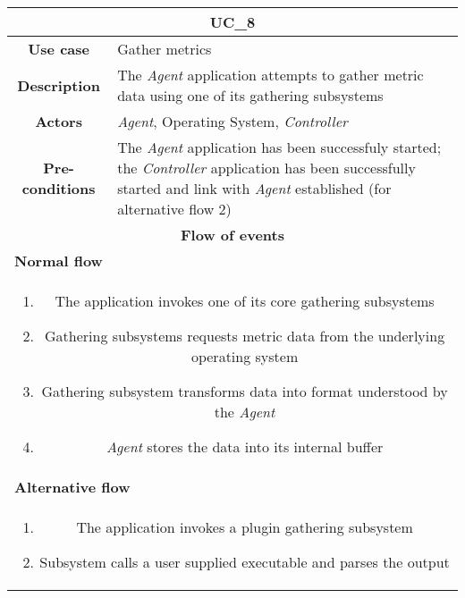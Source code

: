             \vspace{0.5cm}
            \noindent
            \begin{longtable}{ |c|p{11.8cm}| }
                \hline
                \multicolumn{2}{|c|}{\cellcolor{lime} \textbf{UC\_8}}\\ \hline
                \cellcolor[gray]{0.9} \textbf{Use case} & Gather metrics\\ \hline
                \cellcolor[gray]{0.9} \textbf{Description} & The \textit{Agent} application attempts to gather metric data using one of its gathering subsystems\\ \hline
                \cellcolor[gray]{0.9} \textbf{Actors} & \textit{Agent}, Operating System, \textit{Controller}\\ \hline
                \cellcolor[gray]{0.9} \textbf{Pre-conditions} & The \textit{Agent} application has been successfuly started; the \textit{Controller} application has been successfully started and link with \textit{Agent} established (for alternative flow 2)\\ \hline
                \multicolumn{2}{|c|}{\cellcolor[gray]{0.9} \textbf{Flow of events}}\\ \hline
                \multicolumn{2}{|l|}{\cellcolor[gray]{0.9} \textbf{Normal flow}}\\ \hline
                \multicolumn{2}{|p{14cm}|}{
                    \begin{enumerate}
                        \item The application invokes one of its core gathering subsystems
                        \item Gathering subsystems requests metric data from the underlying operating system
                        \item Gathering subsystem transforms data into format understood by the \textit{Agent}
                        \item \textit{Agent} stores the data into its internal buffer
                    \end{enumerate}
                }\\ \hline
                \multicolumn{2}{|l|}{\cellcolor[gray]{0.9} \textbf{Alternative flow}}\\ \hline
                \multicolumn{2}{|p{14cm}|}{
                    \begin{enumerate}
                        \item The application invokes a plugin gathering subsystem
                        \item Subsystem calls a user supplied executable and parses the output

\end{enumerate}}
\end{longtable}
